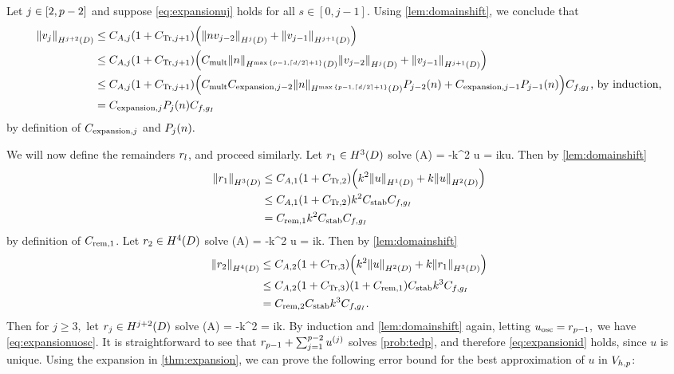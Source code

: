 Let $j \in \mleft[2,p-2\mright]$ and suppose \cref{eq:expansionuj} holds for all $s \in [0,j-1].$ Using \cref{lem:domainshift}, we conclude that
\begin{align*}
  \NHfn{j+2}{D}{\vj} &\leq \CAj \mleft(1+\CTrjpo\mright)\mleft(\NHfn{j}{D}{n\vfn{j-2}} + \NHfn{j+1}{D}{\vfn{j-1}}\mright)\\
  &\leq \CAj \mleft(1+\CTrjpo\mright)\mleft(\Cmult\SNtemp{n}\NHfn{j}{D}{\vfn{j-2}} + \NHfn{j+1}{D}{\vfn{j-1}}\mright)\\
  &\leq \CAj \mleft(1+\CTrjpo\mright)\mleft(\Cmult\Cefn{j-2}\SNtemp{n}\Pfn{j-2}(n) + \Cefn{j-1}\Pfn{j-1}(n)\mright)\Cfg\text{, by induction,}\\
&= \Cefn{j} \Pfn{j}(n)\Cfg
\end{align*}
by definition of $C_{\mathrm{expansion},j}$ and $P_{j}(n).$

We will now define the remainders $r_{l}$, and proceed similarly.
Let $\ro \in \HthD$ solve
\beqs
\grad \cdot \mleft(A\grad \ro\mright) = -k^2 u \tand \dn \ro = ik\trGI u.
\eeqs
Then by \cref{lem:domainshift}
\begin{align*}
  \NHthD{\ro} &\leq \CAo\mleft(1+\CTrt\mright)\mleft(k^2\NHoD{u} + k\NHtD{u}\mright)\\
  &\leq \CAo\mleft(1+\CTrt\mright)k^2\CAnk\Cfg\\
  &= \Cremfn{1}k^2\CAnk \Cfg
\end{align*}
by definition of $C_{\mathrm{rem},1}$.
Let $\rt \in \HfD$ solve
\beqs
\grad \cdot \mleft(A\grad \rt\mright) = -k^2 u \tand \dn \rt = ik\trGI \ro.
\eeqs
Then by \cref{lem:domainshift}
\begin{align*}
\NHfD{\rt} &\leq \CAt\mleft(1+\CTrth\mright)\mleft(k^2\NHtD{u} + k\NHthD{\ro}\mright)\\
&\leq \CAt\mleft(1+\CTrth\mright)\mleft(1 + \Cremfn{1}\mright)\CAnk k^3\Cfg\\
&=\Cremfn{2}\CAnk k^3\Cfg.
\end{align*}
Then for $j \geq 3,$ let $\rj \in \HjptD$ solve
\beqs
\grad \cdot \mleft(A\grad \rj\mright) = -k^2 \rjmt \tand \dn \rj = ik\trGI\rjmo.
\eeqs
By induction and \cref{lem:domainshift} again, letting $u_{\mathrm{osc}} = r_{p-1},$ we have \cref{eq:expansionuosc}. It is straightforward to see that $r_{p-1} + \sum_{j=1}^{p-2} u^{(j)}$ solves \cref{prob:tedp}, and therefore \cref{eq:expansionid} holds, since $u$ is unique.
\epf
Using the expansion in \cref{thm:expansion}, we can prove the following error bound for the best approximation of $u$ in $V_{h,p}$:


